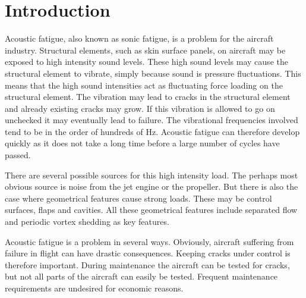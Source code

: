 \chapter{Introduction}
Acoustic fatigue, also known as sonic fatigue, is a problem for the aircraft industry. Structural elements, such as skin surface panels, on aircraft may be exposed to high intensity sound levels. These high sound levels may cause the structural element to vibrate, simply because sound is pressure fluctuations. This means that the high sound intensities act as fluctuating force loading on the structural element. The vibration may lead to cracks in the structural element and already existing cracks may grow. If this vibration is allowed to go on unchecked it may eventually lead to failure. The vibrational frequencies involved tend to be in the order of hundreds of Hz. Acoustic fatigue can therefore develop quickly as it does not take a long time before a large number of cycles have passed. 

There are several possible sources for this high intensity load. The perhaps most obvious source is noise from the jet engine or the propeller. But there is also the case where geometrical features cause strong loads. These may be control surfaces, flaps and cavities. All these geometrical features include separated flow and periodic vortex shedding as key features. 

Acoustic fatigue is a problem in several ways. Obviously, aircraft suffering from failure in flight can have drastic consequences. Keeping cracks under control is therefore important. During maintenance the aircraft can be tested for cracks, but not all parts of the aircraft can easily be tested. Frequent maintenance requirements are undesired for economic reasons. 

